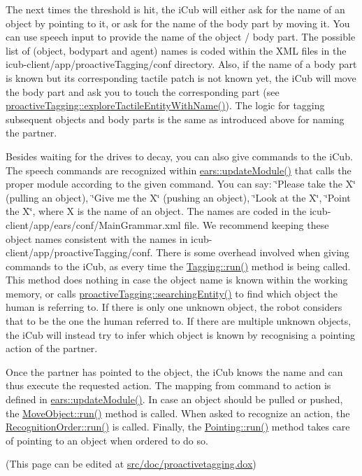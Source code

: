 The next times the threshold is hit, the i\+Cub will either ask for the name of an object by pointing to it, or ask for the name of the body part by moving it. You can use speech input to provide the name of the object / body part. The possible list of (object, bodypart and agent) names is coded within the X\+ML files in the {\ttfamily icub-\/client/app/proactive\+Tagging/conf} directory. Also, if the name of a body part is known but its corresponding tactile patch is not known yet, the i\+Cub will move the body part and ask you to touch the corresponding part (see \hyperlink{classproactiveTagging_ad767fe5d8389c2773da1d34501b8b792}{proactive\+Tagging\+::explore\+Tactile\+Entity\+With\+Name()}). The logic for tagging subsequent objects and body parts is the same as introduced above for naming the partner.

Besides waiting for the drives to decay, you can also give commands to the i\+Cub. The speech commands are recognized within \hyperlink{group__ears_ae6ddc924bc901594ab56603aacb2b95f}{ears\+::update\+Module()} that calls the proper module according to the given command. You can say\+: \char`\"{}\+Please take the X\char`\"{} (pulling an object), \char`\"{}\+Give me the X\char`\"{} (pushing an object), \char`\"{}\+Look at the X\char`\"{}, \char`\"{}\+Point the X\char`\"{}, where X is the name of an object. The names are coded in the {\ttfamily icub-\/client/app/ears/conf/\+Main\+Grammar.\+xml} file. We recommend keeping these object names consistent with the names in {\ttfamily icub-\/client/app/proactive\+Tagging/conf}. There is some overhead involved when giving commands to the i\+Cub, as every time the \hyperlink{group__behaviorManager_a8427d7f479b580bbf54030015b506374}{Tagging\+::run()} method is being called. This method does nothing in case the object name is known within the working memory, or calls \hyperlink{classproactiveTagging_a06f3da8e08290cc4e667dc1f1ab0a2ba}{proactive\+Tagging\+::searching\+Entity()} to find which object the human is referring to. If there is only one unknown object, the robot considers that to be the one the human referred to. If there are multiple unknown objects, the i\+Cub will instead try to infer which object is known by recognising a pointing action of the partner.

Once the partner has pointed to the object, the i\+Cub knows the name and can thus execute the requested action. The mapping from command to action is defined in \hyperlink{group__ears_ae6ddc924bc901594ab56603aacb2b95f}{ears\+::update\+Module()}. In case an object should be pulled or pushed, the \hyperlink{group__behaviorManager_a2e242410f34618b2ff73f9106732470b}{Move\+Object\+::run()} method is called. When asked to recognize an action, the \hyperlink{group__behaviorManager_a0a095aa1af770bac92f30042cee21e3a}{Recognition\+Order\+::run()} is called. Finally, the \hyperlink{group__behaviorManager_a6f1a7b52f3c846009e6b510dbb728011}{Pointing\+::run()} method takes care of pointing to an object when ordered to do so.

(This page can be edited at \hyperlink{proactivetagging_8dox}{src/doc/proactivetagging.\+dox}) 